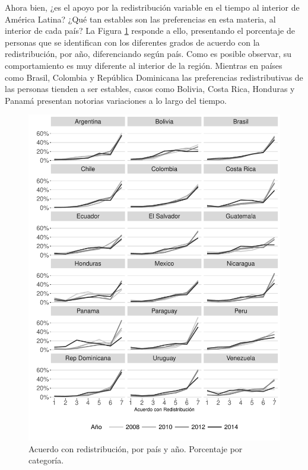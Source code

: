 \documentclass[12pt,letterpaper]{article}
\begin{document}
Ahora bien, ¿es el apoyo por la redistribución variable en el tiempo al interior de América Latina? ¿Qué tan estables son las preferencias en esta materia, al interior de cada país? La Figura \ref{fig:g3} responde a ello, presentando el porcentaje de personas que se identifican con los diferentes grados de acuerdo con la redistribución, por año, diferenciando según país. Como es posible observar, su comportamiento es muy diferente al interior de la región. Mientras en países como Brasil, Colombia y República Dominicana las preferencias redistributivas de las personas tienden a ser estables, casos como Bolivia, Costa Rica, Honduras y Panamá presentan notorias variaciones a lo largo del tiempo. \\

\begin{figure}[p]
	\begin{center}
		\includegraphics[width=1.05\textwidth]{G2a.pdf}
		\caption[Acuerdo con redistribución, por país y año. Porcentaje por categoría.]{Acuerdo con redistribución, por país y año. Porcentaje por categoría.}
		\label{fig:g3}
	\end{center}
\end{figure}
\end{document}
